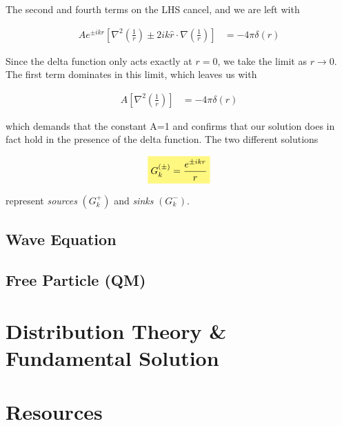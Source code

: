 \documentclass[11pt]{article}
\theoremstyle{plain}
\theoremstyle{definition}
\newcommand{\highlight}[1]{%
  \colorbox{yellow!50}{$\displaystyle#1$}}
\begin{document}
The second and fourth terms on the LHS cancel, and we are left with

\begin{align}
    A e^{\pm ikr} \left[ \nabla^2 \left(\frac{1}{r}\right) \pm 2ik  \hat r \cdot \nabla \left( \frac{1}{r} \right) \right] &= -4\pi \delta(r)
\end{align}

Since the delta function only acts exactly at $r=0$, we take the limit as $r \rightarrow 0$. The first term dominates in this limit, which leaves us with

\begin{align}
    A \left[ \nabla^2 \left(\frac{1}{r}\right) \right] &= -4\pi \delta(r)
\end{align}

which demands that the constant A=1 and confirms that our solution does in fact hold in the presence of the delta function. The two different solutions

\begin{align}
    \highlight{G_k^{\left( \pm \right)} = \frac{e^{\pm ikr}}{r} }
\end{align}

represent \textit{sources} $\left( G_k^+ \right)$ and \textit{sinks} $\left( G_k^- \right)$.






\subsection{Wave Equation}
\subsection{Free Particle (QM)}

\section{Distribution Theory \& Fundamental Solution}
\section{Resources}
\end{document}
